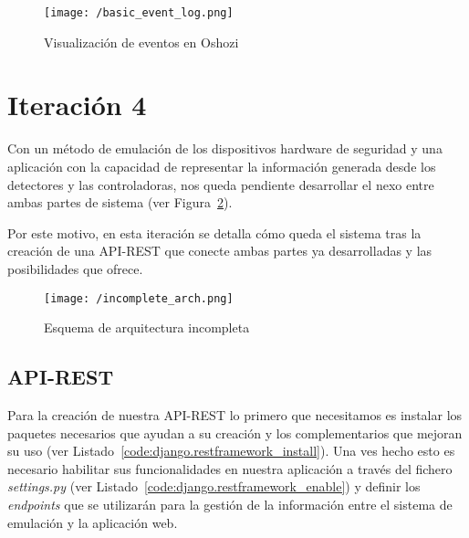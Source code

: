 \begin{figure}[h]
\centering
\texttt{[image: /basic\_event\_log.png]}
\caption{Visualización de eventos en Oshozi}
\label{fig:basic_event_log}
\end{figure}


\section{Iteración 4}

Con un método de emulación de los dispositivos hardware de seguridad y una aplicación con la capacidad de representar la información generada desde los detectores y las controladoras, nos queda pendiente desarrollar el nexo entre ambas partes de sistema (ver Figura~\ref{fig:incomplete_architecture}).

Por este motivo, en esta iteración se detalla cómo queda el sistema tras la creación de una \acs{API}-\acs{REST} que conecte ambas partes ya desarrolladas y las posibilidades que ofrece.

\begin{figure}[!h]
\centering
\texttt{[image: /incomplete\_arch.png]}
\caption{Esquema de arquitectura incompleta}
\label{fig:incomplete_architecture}
\end{figure}

\subsection{\acs{API}-\acs{REST}}

Para la creación de nuestra \acs{API}-\acs{REST} lo primero que necesitamos es instalar los paquetes necesarios que ayudan a su creación y los complementarios que mejoran su uso (ver Listado~\ref{code:django.restframework_install}). Una ves hecho esto es necesario habilitar sus funcionalidades en nuestra aplicación a través del fichero \textit{settings.py} (ver Listado~\ref{code:django.restframework_enable}) y definir los \textit{endpoints} que se utilizarán para la gestión de la información entre el sistema de emulación y la aplicación web.






